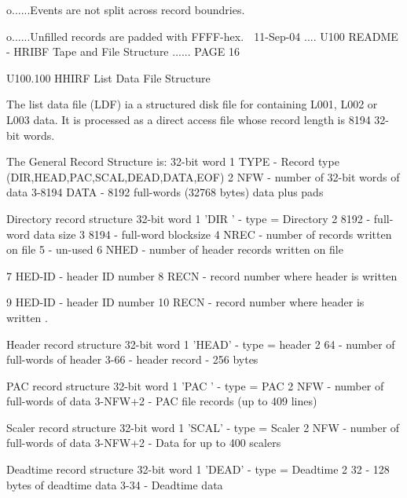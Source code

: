  
   o......Events are not split across record boundries.
 
   o......Unfilled records are padded with FFFF-hex.
    
   11-Sep-04 .... U100  README - HRIBF Tape and File Structure ...... PAGE  16
 
 
   U100.100  HHIRF List Data File Structure
 
   The  list  data  file  (LDF) ia a structured disk file for containing L001,
   L002 or L003 data. It is processed as a direct  access  file  whose  record
   length is 8194 32-bit words.
 
   The General Record Structure is:
   32-bit word  1       TYPE  - Record type (DIR,HEAD,PAC,SCAL,DEAD,DATA,EOF)
                2       NFW   - number of 32-bit words of data
                3-8194  DATA  - 8192 full-words (32768 bytes) data plus pads
 
   Directory record structure
   32-bit word  1       'DIR '  - type = Directory
                2       8192    - full-word data size
                3       8194    - full-word blocksize
                4       NREC    - number of records written on file
                5               - un-used
                6       NHED    - number of header records written on file
 
                7       HED-ID  - header ID number
                8       RECN    - record number where header is written
 
                9       HED-ID  - header ID number
               10       RECN    - record number where header is written
                .
 
   Header record structure
   32-bit word  1       'HEAD'  - type = header
                2        64     - number of full-words of header
                3-66            - header record - 256 bytes
 
   PAC record structure
   32-bit word  1       'PAC '  - type = PAC
                2        NFW    - number of full-words of data
                3-NFW+2         - PAC file records (up to 409 lines)
 
   Scaler record structure
   32-bit word  1       'SCAL'  - type = Scaler
                2        NFW    - number of full-words of data
                3-NFW+2         - Data for up to 400 scalers
 
   Deadtime record structure
   32-bit word  1       'DEAD'  - type = Deadtime
                2        32     - 128 bytes of deadtime data
                3-34            - Deadtime data
 
